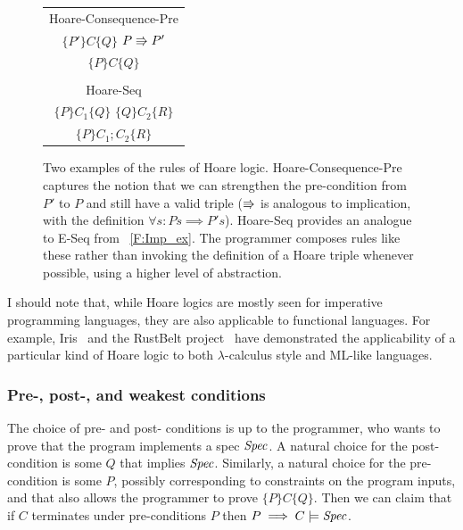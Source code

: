 \begin{figure}
    \centering
    \begin{tabular}{c}
        Hoare-Consequence-Pre \\
        \(\{P'\} C \{Q\}\) \quad \(P \mathrel{\Rrightarrow} P'\) \\
        \midrule
        \(\{P\} C \{Q\}\) \\

        \\

        Hoare-Seq \\
        \(\{P\} C_1 \{Q\}\) \quad \(\{Q\} C_2 \{R\}\) \\
        \midrule
        \(\{P\} C_1;C_2 \{R\}\)
    \end{tabular}
    \caption{Two examples of the rules of Hoare logic. Hoare-Consequence-Pre
    captures the notion that we can strengthen the pre-condition from \(P'\) to
    \(P\) and still have a valid triple (\(\mathrel{\Rrightarrow}\) is analogous to implication,
    with the definition \(\forall s: P s \implies P' s\)). Hoare-Seq provides an
    analogue to E-Seq from \figurename~\ref{F:Imp_ex}. The programmer composes
    rules like these rather than invoking the definition of a Hoare triple
    whenever possible, using a higher level of abstraction.}\label{F:Hoare_ex}
\end{figure}

I should note that, while Hoare logics are mostly seen for imperative
programming languages, they are also applicable to functional languages. For
example, Iris~\cite[\S 5.1]{Krebbers_2017b} and the RustBelt project~\cite[\S
3.2, esp. \figurename~3]{Jung_2018a} have demonstrated the applicability of a
particular kind of Hoare logic to both \(\lambda\)-calculus style and ML-like
languages.

\subsubsection{Pre-, post-, and weakest conditions}

The choice of pre- and post- conditions is up to the programmer, who wants to
prove that the program implements a spec \(\mathit{Spec}\). A natural choice for
the post-condition is some \(Q\) that implies \(\mathit{Spec}\). Similarly, a
natural choice for the pre-condition is some \(P\), possibly corresponding to
constraints on the program inputs, and that also allows the programmer to prove
\(\{P\} C \{Q\}\). Then we can claim that if \(C\) terminates under
pre-conditions \(P\) then \(P \implies C \models \mathit{Spec}\).

